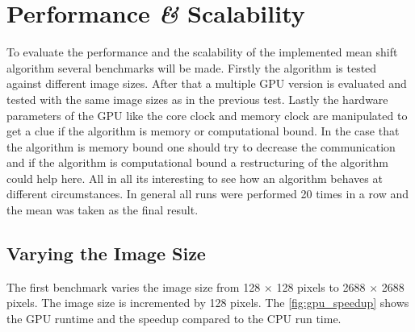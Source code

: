 \chapter{Performance {\itshape{\&}} Scalability} %
\label{cha:performance_and_scalability_}

To evaluate the performance and the scalability of the implemented mean shift
algorithm several benchmarks will be made. Firstly the algorithm is tested 
against different image sizes. After that a multiple \gls{GPU} version is 
evaluated and tested with the same image sizes as in the previous test. Lastly
the hardware parameters of the \gls{GPU} like the core clock and memory clock
are manipulated to get a clue if the algorithm is memory or computational bound. 
In the case that the algorithm is memory bound one should try to decrease the
communication and if the algorithm is computational bound a restructuring of 
the algorithm could help here. All in all its interesting to see how an algorithm
behaves at different circumstances. In general all runs were performed 20 times
in a row and the mean was taken as the final result.

\section{Varying the Image Size} %
\label{sec:varying_the_image_size}
The first benchmark varies the image size from 128 $\times$ 128 pixels to 2688
$\times$ 2688 pixels. The image size is incremented by 128 pixels. The
\autoref{fig:gpu_speedup} shows the \gls{GPU} runtime and the speedup compared
to the \gls{CPU} run time. 


